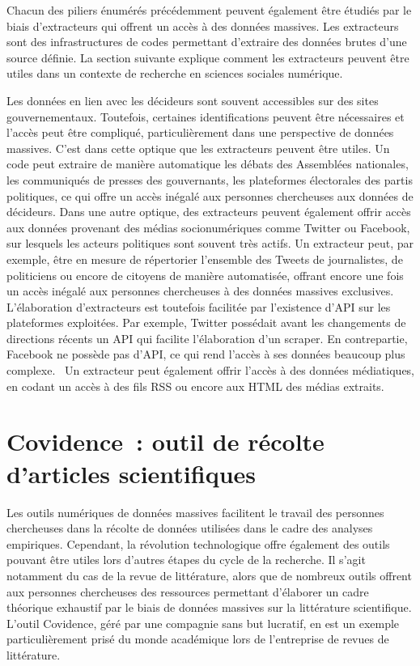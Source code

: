 \documentclass[
  letterpaper,
]{scrbook}
\begin{document}
Chacun des piliers énumérés précédemment peuvent également être étudiés
par le biais d'extracteurs qui offrent un accès à des données massives.
Les extracteurs sont des infrastructures de codes permettant d'extraire
des données brutes d'une source définie. La section suivante explique
comment les extracteurs peuvent être utiles dans un contexte de
recherche en sciences sociales numérique.

Les données en lien avec les décideurs sont souvent accessibles sur des
sites gouvernementaux. Toutefois, certaines identifications peuvent être
nécessaires et l'accès peut être compliqué, particulièrement dans une
perspective de données massives. C'est dans cette optique que les
extracteurs peuvent être utiles. Un code peut extraire de manière
automatique les débats des Assemblées nationales, les communiqués de
presses des gouvernants, les plateformes électorales des partis
politiques, ce qui offre un accès inégalé aux personnes chercheuses aux
données de décideurs. Dans une autre optique, des extracteurs peuvent
également offrir accès aux données provenant des médias socionumériques
comme Twitter ou Facebook, sur lesquels les acteurs politiques sont
souvent très actifs. Un extracteur peut, par exemple, être en mesure de
répertorier l'ensemble des Tweets de journalistes, de politiciens ou
encore de citoyens de manière automatisée, offrant encore une fois un
accès inégalé aux personnes chercheuses à des données massives
exclusives. L'élaboration d'extracteurs est toutefois facilitée par
l'existence d'API sur les plateformes exploitées. Par exemple, Twitter
possédait avant les changements de directions récents un API qui
facilite l'élaboration d'un scraper. En contrepartie, Facebook ne
possède pas d'API, ce qui rend l'accès à ses données beaucoup plus
complexe. ~Un extracteur peut également offrir l'accès à des données
médiatiques, en codant un accès à des fils RSS ou encore aux HTML des
médias extraits.

\hypertarget{covidence-outil-de-ruxe9colte-darticles-scientifiques}{%
\section{\texorpdfstring{\textbf{Covidence~: outil de récolte d'articles
scientifiques}}{Covidence~: outil de récolte d'articles scientifiques}}\label{covidence-outil-de-ruxe9colte-darticles-scientifiques}}

Les outils numériques de données massives facilitent le travail des
personnes chercheuses dans la récolte de données utilisées dans le cadre
des analyses empiriques. Cependant, la révolution technologique offre
également des outils pouvant être utiles lors d'autres étapes du cycle
de la recherche. Il s'agit notamment du cas de la revue de littérature,
alors que de nombreux outils offrent aux personnes chercheuses des
ressources permettant d'élaborer un cadre théorique exhaustif par le
biais de données massives sur la littérature scientifique. L'outil
Covidence, géré par une compagnie sans but lucratif, en est un exemple
particulièrement prisé du monde académique lors de l'entreprise de
revues de littérature.
\end{document}
